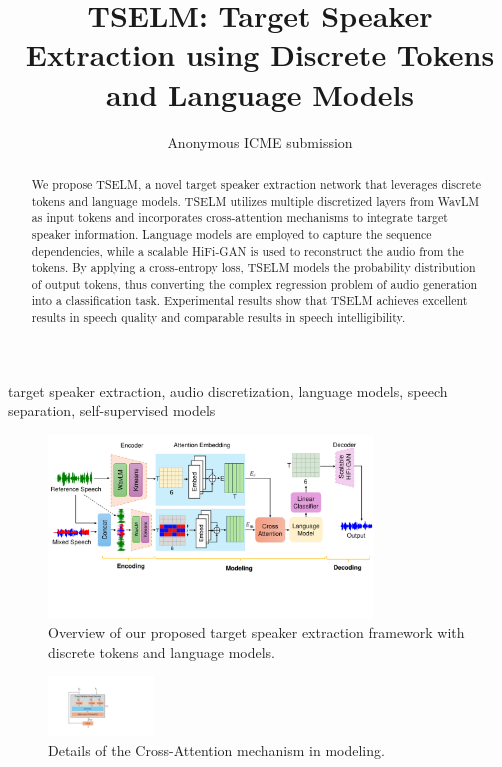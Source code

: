 \documentclass[conference]{IEEEtran}
\begin{document}
\title{TSELM: Target Speaker Extraction using Discrete Tokens and Language Models
}

\author{Anonymous ICME submission}

\maketitle

\begin{abstract}
  We propose TSELM, a novel target speaker extraction network that leverages discrete tokens and language models. TSELM utilizes multiple discretized layers from WavLM as input tokens and incorporates cross-attention mechanisms to integrate target speaker information. Language models are employed to capture the sequence dependencies, while a scalable HiFi-GAN is used to reconstruct the audio from the tokens. By applying a cross-entropy loss, TSELM models the probability distribution of output tokens, thus converting the complex regression problem of audio generation into a classification task.
  Experimental results show that TSELM achieves excellent results in speech 
  quality and comparable results in speech intelligibility. 
\end{abstract}

\begin{IEEEkeywords}
target speaker extraction, audio discretization, language models, speech separation, self-supervised models
\end{IEEEkeywords}
\begin{figure}[t]
    \centering
    \includegraphics[width=0.77\textwidth]{assets/model.pdf}
    \caption{Overview of our proposed target speaker extraction framework with discrete tokens and language models.}
    \label{model}
    \vspace{-4pt}
    \end{figure}

    \begin{figure}
        \centering
        \includegraphics[width=0.25\textwidth]{assets/cross_attention.pdf}
        \caption{Details of the Cross-Attention mechanism in modeling.}
        \label{cross_attention}
        \vspace{-5pt}
        \end{figure}
\end{document}
